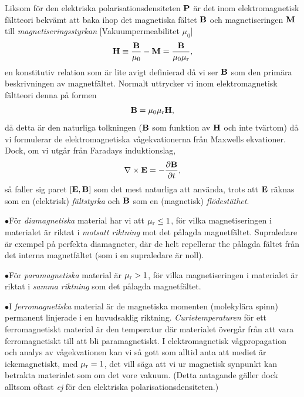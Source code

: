 {{{{{Liksom f{\"o}r den elektriska polarisationsdensiteten ${\bf P}$ {\"a}r det
inom elektromagnetisk f{\"a}ltteori bekv{\"a}mt att baka ihop det magnetiska
f{\"a}ltet ${\bf B}$ och magnetiseringen ${\bf M}$ till
{\it magnetiseringsstyrkan}
[Vakuumpermeabilitet $\mu_0$]
$$
  {\bf H}\equiv{{\bf B}\over{\mu_0}}-{\bf M}
    ={{\bf B}\over{\mu_0\mu_{\rm r}}},
$$
en konstitutiv relation som {\"a}r lite avigt definierad d{\aa} vi ser ${\bf B}$
som den prim{\"a}ra beskrivningen av magnetf{\"a}ltet. Normalt uttrycker vi inom
elektromagnetisk f{\"a}ltteori denna p{\aa} formen
$$
  {\bf B}=\mu_0\mu_{\rm r}{\bf H},
$$
d{\aa} detta {\"a}r den naturliga tolkningen (${\bf B}$ som funktion av
${\bf H}$ och inte tv{\"a}rtom) d{\aa} vi formulerar de elektromagnetiska
v{\aa}gekvationerna fr{\aa}n Maxwells ekvationer. Dock, om vi utg{\aa}r
fr{\aa}n Faradays induktionslag,
$$
  \nabla\times{\bf E}=-{{\partial{\bf B}}\over{\partial t}},
$$
s{\aa} faller sig paret $[{\bf E},{\bf B}]$ som det mest naturliga att
anv{\"a}nda, trots att ${\bf E}$ r{\"a}knas som en (elektrisk)
{\it f{\"a}ltstyrka} och ${\bf B}$ som en (magnetisk) {\it fl{\"o}dest{\"a}thet}.
\medskip
\item{$\bullet$}{F{\"o}r {\it diamagnetiska} material 
   har vi att $\mu_{\rm r}\le 1$, f{\"o}r vilka magnetiseringen i materialet
   {\"a}r riktat i {\it motsatt riktning} mot det p{\aa}lagda magnetf{\"a}ltet.
   Supraledare {\"a}r exempel p{\aa} perfekta diamagneter, d{\"a}r de helt
   repellerar the p{\aa}lagda f{\"a}ltet fr{\aa}n det interna magnetf{\"a}ltet
   (som i en supraledare {\"a}r noll).}
\item{$\bullet$}{F{\"o}r {\it paramagnetiska} material 
   {\"a}r $\mu_{\rm r}>1$, f{\"o}r vilka magnetiseringen i materialet {\"a}r
   riktat i {\it samma riktning} som det p{\aa}lagda magnetf{\"a}ltet.}
\item{$\bullet$}{I {\it ferromagnetiska} material 
   {\"a}r de magnetiska momenten (molekyl{\"a}ra spinn) permanent linjerade
   i en huvudsaklig riktning. {\it Curietemperaturen} 
   f{\"o}r ett ferromagnetiskt material {\"a}r den temperatur d{\"a}r
   materialet {\"o}verg{\aa}r fr{\aa}n att vara ferromagnetiskt till att
   bli paramagnetiskt.}
\medskip
\noindent
I elektromagnetisk v{\aa}gpropagation och analys av v{\aa}gekvationen kan vi
s{\aa} gott som alltid anta att mediet {\"a}r ickemagnetiskt, med
$\mu_{\rm r}=1$, det vill s{\"a}ga att vi ur magnetisk synpunkt kan betrakta
materialet som om det vore vakuum. (Detta antagande g{\"a}ller dock alltsom
oftast {\it ej} f{\"o}r den elektriska polarisationsdensiteten.)

}}}}}

